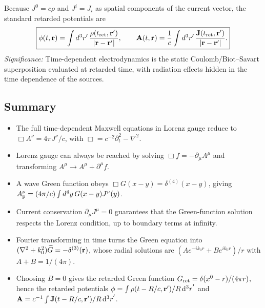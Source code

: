 Because $J^0=c\rho$ and $J^i=J_i$ as spatial components of the current vector, the standard
retarded potentials are
\begin{equation}\label{eq:lec20-retarded-potentials}
  \boxed{\phi(t,\mathbf{r})=\int d^3r'\,\frac{\rho(t_{\rm ret},\mathbf{r}')}{|\mathbf{r}-\mathbf{r}'|},\qquad
  \mathbf{A}(t,\mathbf{r})=\frac{1}{c}\int d^3r'\,\frac{\mathbf{J}(t_{\rm ret},\mathbf{r}')}{|\mathbf{r}-\mathbf{r}'|}.}
\end{equation}
\textit{Significance:} Time-dependent electrodynamics is the static Coulomb/Biot--Savart superposition evaluated at retarded time, with radiation effects hidden in the time dependence of the sources.


\subsection{Summary}\label{subsec:lec20-summary}

\begin{itemize}
  \item The full time-dependent Maxwell equations in Lorenz gauge reduce to
        $\Box A^\nu=4\pi J^\nu/c$, with $\Box=c^{-2}\partial_t^2-\nabla^2$.
  \item Lorenz gauge can always be reached by solving $\Box f=-\partial_\mu A^\mu$ and
        transforming $A^\mu\to A^\mu+\partial^\mu f$.
  \item A wave Green function obeys $\Box G(x-y)=\delta^{(4)}(x-y)$, giving
        $A^\nu_{\rm p}=(4\pi/c)\int d^4y\,G(x-y)J^\nu(y)$.
  \item Current conservation $\partial_\mu J^\mu=0$ guarantees that the Green-function
        solution respects the Lorenz condition, up to boundary terms at infinity.
  \item Fourier transforming in time turns the Green equation into
        $(\nabla^2+k_0^2)\widetilde G=-\delta^{(3)}(\mathbf{r})$, whose radial solutions are
        $(Ae^{-ik_0r}+Be^{ik_0r})/r$ with $A+B=1/(4\pi)$.
  \item Choosing $B=0$ gives the retarded Green function
        $G_{\rm ret}=\delta(x^0-r)/(4\pi r)$, hence the retarded potentials
        $\phi=\int \rho(t-R/c,\mathbf{r}')/R\dd[3]{r}'$ and
        $\mathbf{A}=c^{-1}\int \mathbf{J}(t-R/c,\mathbf{r}')/R\dd[3]{r}'$.
\end{itemize}


